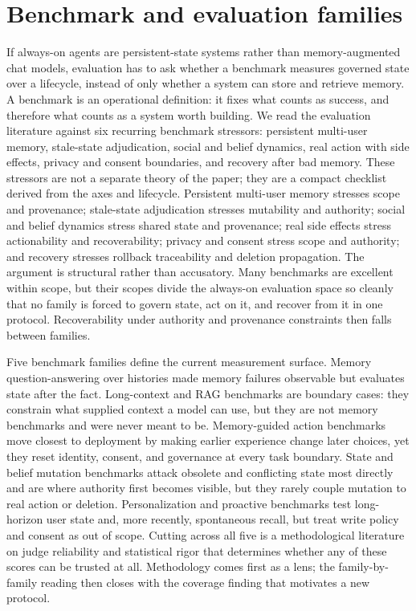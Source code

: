 \section{Benchmark and evaluation families}\label{sec:evaluation}


If always-on agents are persistent-state systems rather than memory-augmented chat models, evaluation has to ask whether a benchmark measures governed state over a lifecycle, instead of only whether a system can store and retrieve memory. A benchmark is an operational definition: it fixes what counts as success, and therefore what counts as a system worth building. We read the evaluation literature against six recurring benchmark stressors: persistent multi-user memory, stale-state adjudication, social and belief dynamics, real action with side effects, privacy and consent boundaries, and recovery after bad memory. These stressors are not a separate theory of the paper; they are a compact checklist derived from the axes and lifecycle. Persistent multi-user memory stresses scope and provenance; stale-state adjudication stresses mutability and authority; social and belief dynamics stress shared state and provenance; real side effects stress actionability and recoverability; privacy and consent stress scope and authority; and recovery stresses rollback traceability and deletion propagation. The argument is structural rather than accusatory. Many benchmarks are excellent within scope, but their scopes divide the always-on evaluation space so cleanly that no family is forced to govern state, act on it, and recover from it in one protocol. Recoverability under authority and provenance constraints then falls between families.

Five benchmark families define the current measurement surface. Memory question-answering over histories made memory failures observable but evaluates state after the fact. Long-context and RAG benchmarks are boundary cases: they constrain what supplied context a model can use, but they are not memory benchmarks and were never meant to be. Memory-guided action benchmarks move closest to deployment by making earlier experience change later choices, yet they reset identity, consent, and governance at every task boundary. State and belief mutation benchmarks attack obsolete and conflicting state most directly and are where authority first becomes visible, but they rarely couple mutation to real action or deletion. Personalization and proactive benchmarks test long-horizon user state and, more recently, spontaneous recall, but treat write policy and consent as out of scope. Cutting across all five is a methodological literature on judge reliability and statistical rigor that determines whether any of these scores can be trusted at all. Methodology comes first as a lens; the family-by-family reading then closes with the coverage finding that motivates a new protocol.

